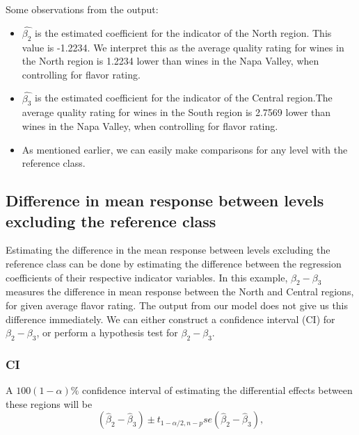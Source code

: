 \documentclass[
]{book}
\begin{document}
Some observations from the output:

\begin{itemize}
\item
  \(\hat{\beta_2}\) is the estimated coefficient for the indicator of the North region. This value is -1.2234. We interpret this as the average quality rating for wines in the North region is 1.2234 lower than wines in the Napa Valley, when controlling for flavor rating.
\item
  \(\hat{\beta_3}\) is the estimated coefficient for the indicator of the Central region.The average quality rating for wines in the South region is 2.7569 lower than wines in the Napa Valley, when controlling for flavor rating.
\item
  As mentioned earlier, we can easily make comparisons for any level with the reference class.
\end{itemize}

\hypertarget{difference-in-mean-response-between-levels-excluding-the-reference-class}{%
\subsection{Difference in mean response between levels excluding the reference class}\label{difference-in-mean-response-between-levels-excluding-the-reference-class}}

Estimating the difference in the mean response between levels excluding the reference class can be done by estimating the difference between the regression coefficients of their respective indicator variables. In this example, \(\beta_2 - \beta_3\) measures the difference in mean response between the North and Central regions, for given average flavor rating. The output from our model does not give us this difference immediately. We can either construct a confidence interval (CI) for \(\beta_2 - \beta_3\), or perform a hypothesis test for \(\beta_2 - \beta_3\).

\hypertarget{ci}{%
\subsubsection{CI}\label{ci}}

A \(100(1-\alpha)\%\) confidence interval of estimating the
differential effects between these regions will be
\begin{equation}
(\hat{\beta}_2-\hat{\beta}_3) \pm
t_{1-\alpha/2,n-p}se\left(\hat{\beta}_2-\hat{\beta}_3\right),
\label{eq:8CI}
\end{equation}
\end{document}
